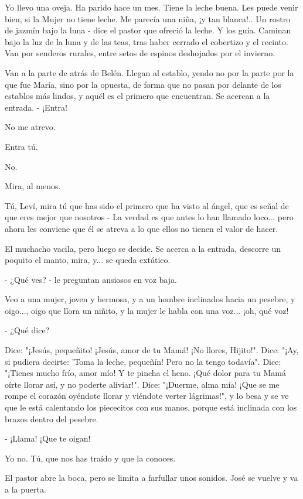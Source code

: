 \documentclass[12pt]{book} %
\begin{document}
Yo llevo una oveja. Ha parido hace un mes. Tiene la leche buena. Les puede venir bien, si la Mujer no tiene leche. Me parecía una niña, ¡y tan blanca!.. Un rostro de jazmín bajo la luna - dice el pastor que ofreció la leche. Y los guía. Caminan bajo la luz de la luna y de las teas, tras haber cerrado el cobertizo y el recinto. Van por senderos rurales, entre setos de espinos deshojados por el invierno. 

Van a la parte de atrás de Belén. Llegan al establo, yendo no por la parte por la que fue María, sino por la opuesta, de forma que no pasan por delante de los establos más lindos, y aquél es el primero que encuentran. Se acercan a la entrada. - ¡Entra! 

No me atrevo. 

Entra tú. 

No. 

Mira, al menos. 

Tú, Leví, mira tú que has sido el primero que ha visto al ángel, que es señal de que eres mejor que nosotros - La verdad es que antes lo han llamado loco... pero ahora les conviene que él se atreva a lo que ellos no tienen el valor de hacer. 

El muchacho vacila, pero luego se decide. Se acerca a la entrada, descorre un poquito el manto, mira, y... se queda extático. 

- ¿Qué ves? - le preguntan ansiosos en voz baja. 

Veo a una mujer, joven y hermosa, y a un hombre inclinados hacia un pesebre, y oigo..., oigo que llora un niñito, y la mujer le habla con una voz... ¡oh, qué voz! 

- ¿Qué dice? 

Dice: "¡Jesús, pequeñito! ¡Jesús, amor de tu Mamá! ¡No llores, Hijito!". Dice: "¡Ay, si pudiera decirte: 'Toma la leche, pequeñín! Pero no la tengo todavía". Dice: "¡Tienes mucho frío, amor mío! Y te pincha el heno. ¡Qué dolor para tu Mamá oírte llorar así, y no poderte aliviar!". Dice: "¡Duerme, alma mía! ¡Que se me rompe el corazón oyéndote llorar y viéndote verter lágrimas!", y lo besa y se ve que le está calentando los piececitos con sus manos, porque está inclinada con los brazos dentro del pesebre. 

- ¡Llama! ¡Que te oigan! 

Yo no. Tú, que nos has traído y que la conoces. 

El pastor abre la boca, pero se limita a farfullar unos sonidos. José se vuelve y va a la puerta. 
\end{document}
